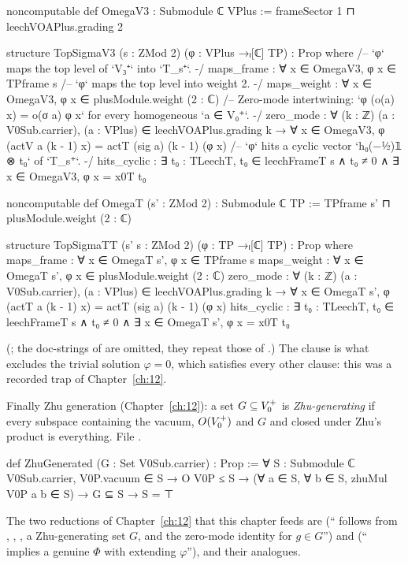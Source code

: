 \begin{leancode}
noncomputable def OmegaV3 : Submodule ℂ VPlus := frameSector 1 ⊓ leechVOAPlus.grading 2

structure TopSigmaV3 (s : ZMod 2) (φ : VPlus →ₗ[ℂ] TP) : Prop where
  /-- `φ` maps the top level of `V₃⁺` into `T_s⁺`. -/
  maps_frame : ∀ x ∈ OmegaV3, φ x ∈ TPframe s
  /-- `φ` maps the top level into weight 2. -/
  maps_weight : ∀ x ∈ OmegaV3, φ x ∈ plusModule.weight (2 : ℂ)
  /-- Zero-mode intertwining: `φ (o(a) x) = o(σ a) φ x` for every homogeneous `a ∈ V₀⁺`. -/
  zero_mode : ∀ (k : ℤ) (a : V0Sub.carrier), (a : VPlus) ∈ leechVOAPlus.grading k →
    ∀ x ∈ OmegaV3, φ (actV a (k - 1) x) = actT (sig a) (k - 1) (φ x)
  /-- `φ` hits a cyclic vector `h₀(−½)𝟙 ⊗ t₀` of `T_s⁺`. -/
  hits_cyclic : ∃ t₀ : TLeechT, t₀ ∈ leechFrameT s ∧ t₀ ≠ 0 ∧ ∃ x ∈ OmegaV3, φ x = x0T t₀

noncomputable def OmegaT (s' : ZMod 2) : Submodule ℂ TP := TPframe s' ⊓ plusModule.weight (2 : ℂ)

structure TopSigmaTT (s' s : ZMod 2) (φ : TP →ₗ[ℂ] TP) : Prop where
  maps_frame : ∀ x ∈ OmegaT s', φ x ∈ TPframe s
  maps_weight : ∀ x ∈ OmegaT s', φ x ∈ plusModule.weight (2 : ℂ)
  zero_mode : ∀ (k : ℤ) (a : V0Sub.carrier), (a : VPlus) ∈ leechVOAPlus.grading k →
    ∀ x ∈ OmegaT s', φ (actT a (k - 1) x) = actT (sig a) (k - 1) (φ x)
  hits_cyclic : ∃ t₀ : TLeechT, t₀ ∈ leechFrameT s ∧ t₀ ≠ 0 ∧ ∃ x ∈ OmegaT s', φ x = x0T t₀
\end{leancode}
(; the doc-strings of  are omitted, they repeat
those of .) The clause  is what excludes the trivial solution
$\varphi=0$, which satisfies every other clause: this was a recorded trap of Chapter~\ref{ch:12}.

Finally Zhu generation (Chapter~\ref{ch:12}): a set $G\subseteq V_0^{+}$ is
\emph{Zhu-generating} if every subspace containing the vacuum, $O(V_0^{+})$ and $G$ and closed
under Zhu's product is everything.
\noindent File .
\begin{leancode}
def ZhuGenerated (G : Set V0Sub.carrier) : Prop :=
  ∀ S : Submodule ℂ V0Sub.carrier, V0P.vacuum ∈ S → O V0P ≤ S →
    (∀ a ∈ S, ∀ b ∈ S, zhuMul V0P a b ∈ S) → G ⊆ S → S = ⊤
\end{leancode}
The two reductions of Chapter~\ref{ch:12} that this chapter feeds are
 (`` follows from ,
, , a Zhu-generating set $G$, and the zero-mode identity for
$g\in G$'') and  (`` implies a genuine
$\Phi$ with  extending $\varphi$''), and their  analogues.

